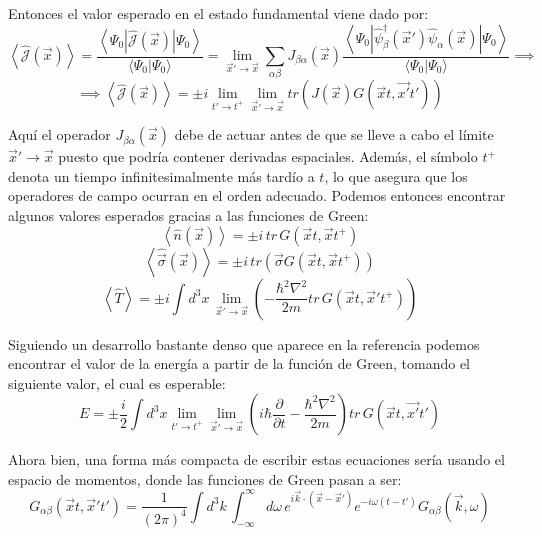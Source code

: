 \documentclass{article} %
\begin{document}
Entonces el valor esperado en el estado fundamental viene dado por:
$$
\left\langle\hat{\mathcal{J}}(\vec{x})\right\rangle = \frac{\left\langle\Psi_0\left|\hat{\mathcal{J}}(\vec{x})\right|\Psi_0\right\rangle}{\langle\Psi_0|\Psi_0\rangle} = \lim_{\vec{x}'\to\vec{x}}\sum_{\alpha\beta}J_{\beta\alpha}(\vec{x})\frac{\left\langle\Psi_0\left|\hat{\psi}^{\dagger}_{\beta}(\vec{x}')\hat{\psi}_{\alpha}(\vec{x})\right|\Psi_0\right\rangle}{\langle\Psi_0|\Psi_0\rangle} \implies
$$
\begin{equation}
    \implies\left\langle\hat{\mathcal{J}}(\vec{x})\right\rangle = \pm i\lim_{t'\to t^+}\lim_{\vec{x}'\to\vec{x}}tr\left(J(\vec{x})G(\vec{x}t, \vec{x'}t')\right)
\end{equation}

Aquí el operador $J_{\beta\alpha}(\vec{x})$ debe de actuar antes de que se lleve a cabo el límite $\vec{x}'\to\vec{x}$ puesto que podría contener derivadas espaciales. Además, el símbolo $t^+$ denota un tiempo infinitesimalmente más tardío a $t$, lo que asegura que los operadores de campo ocurran en el orden adecuado. Podemos entonces encontrar algunos valores esperados gracias a las funciones de Green:
\begin{equation}
    \left\langle\hat{n}(\vec{x})\right\rangle = \pm i \, tr \, G(\vec{x}t, \vec{x}t^+)
\end{equation}
\begin{equation}
    \left\langle\hat{\vec{\sigma}}(\vec{x})\right\rangle = \pm i \, tr \left(\vec{\sigma}G(\vec{x}t, \vec{x}t^+)\right)
\end{equation}
\begin{equation}
    \left\langle\hat{T}\right\rangle = \pm i\int d^3x \, \lim_{\vec{x}'\to\vec{x}}\left(-\frac{\hbar^2\nabla^2}{2m}tr \, G(\vec{x}t, \vec{x}'t^+)\right)
\end{equation}

Siguiendo un desarrollo bastante denso que aparece en la referencia \cite{fetter1971quantum} podemos encontrar el valor de la energía a partir de la función de Green, tomando el siguiente valor, el cual es esperable:
\begin{equation}
    E = \pm\frac{i}{2}\int d^3x\lim_{t'\to t^+}\lim_{\vec{x}'\to\vec{x}}\left(i\hbar\frac{\partial}{\partial t} - \frac{\hbar^2\nabla^2}{2m}\right)tr \, G(\vec{x}t, \vec{x'}t')
\end{equation}

Ahora bien, una forma más compacta de escribir estas ecuaciones sería usando el espacio de momentos, donde las funciones de Green pasan a ser:
\begin{equation}
    G_{\alpha\beta}(\vec{x}t, \vec{x}'t') = \frac{1}{(2\pi)^4}\int d^3k \, \int_{-\infty}^{\infty}d\omega \, e^{i\vec{k}\cdot(\vec{x}-\vec{x}')}e^{-i\omega(t-t')}G_{\alpha\beta}(\vec{k}, \omega)
\end{equation}
\end{document}
